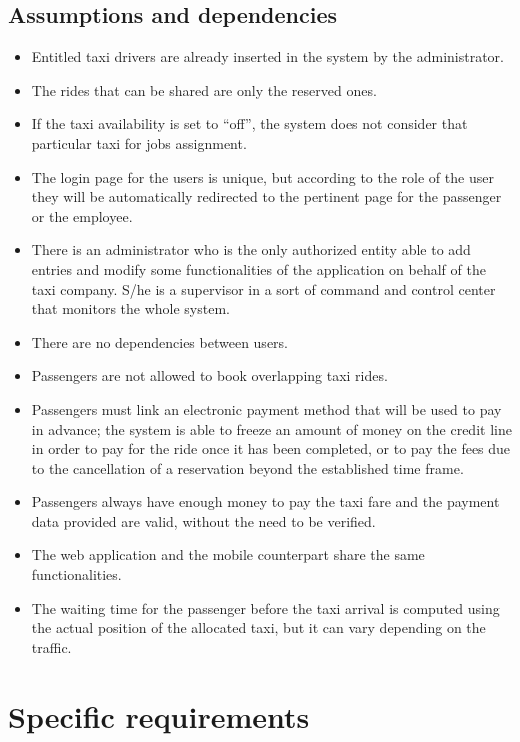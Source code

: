 \documentclass[a4paper,11pt]{report} %
\begin{document}
	\subsection{Assumptions and dependencies}
		\begin{itemize}
			\item Entitled taxi drivers are already inserted in the system by the administrator.
			\item The rides that can be shared are only the reserved ones.
			\item If the taxi availability is set to ``off'', the system does not consider that particular taxi for jobs assignment.
			\item The login page for the users is unique, but according to the role of the user they will be automatically redirected to the pertinent page for the passenger or the employee.
			\item There is an administrator who is the only authorized entity able to add entries and modify some functionalities of the application on behalf of the taxi company. S/he is a supervisor in a sort of command and control center that monitors the whole system.
			\item There are no dependencies between users.
			\item Passengers are not allowed to book overlapping taxi rides.
			\item Passengers must link an electronic payment method that will be used to pay in advance; the system is able to freeze an amount of money on the credit line in order to pay for the ride once it has been completed, or to pay the fees due to the cancellation of a reservation beyond the established time frame.
			\item Passengers always have enough money to pay the taxi fare and the payment data provided are valid, without the need to be verified.
			\item The web application and the mobile counterpart share the same functionalities.
			\item The waiting time for the passenger before the taxi arrival is computed using the actual position of the allocated taxi, but it can vary depending on the traffic.
		\end{itemize}
	
	
	\section{Specific requirements}
	
\end{document}
